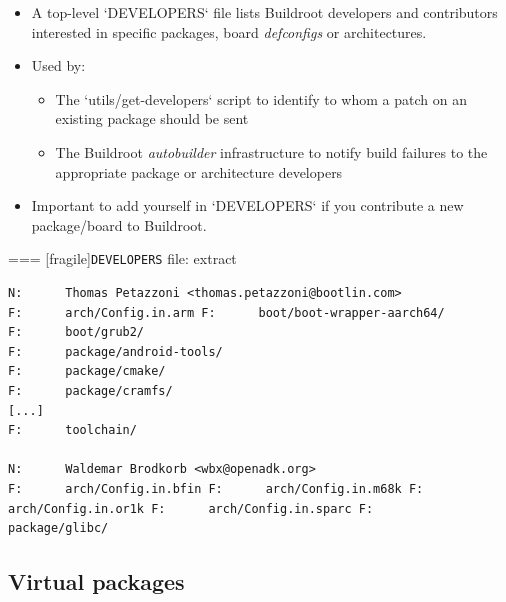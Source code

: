   \begin{itemize}
  \item A top-level `DEVELOPERS` file lists Buildroot developers
    and contributors interested in specific packages, board {\em
      defconfigs} or architectures.
  \item Used by:
    \begin{itemize}
    \item The `utils/get-developers` script to identify to whom a
      patch on an existing package should be sent
    \item The Buildroot {\em autobuilder} infrastructure to notify
      build failures to the appropriate package or architecture
      developers
    \end{itemize}
  \item Important to add yourself in `DEVELOPERS` if you
    contribute a new package/board to Buildroot.
  \end{itemize}



=== [fragile]{{\tt DEVELOPERS} file: extract}
\begin{block}{}
{\tiny
\begin{verbatim}
N:      Thomas Petazzoni <thomas.petazzoni@bootlin.com>
F:      arch/Config.in.arm F:      boot/boot-wrapper-aarch64/
F:      boot/grub2/
F:      package/android-tools/
F:      package/cmake/
F:      package/cramfs/
[...]
F:      toolchain/

N:      Waldemar Brodkorb <wbx@openadk.org>
F:      arch/Config.in.bfin F:      arch/Config.in.m68k F:      arch/Config.in.or1k F:      arch/Config.in.sparc F:      package/glibc/
\end{verbatim}
}
\end{block}


\subsection{Virtual packages}

